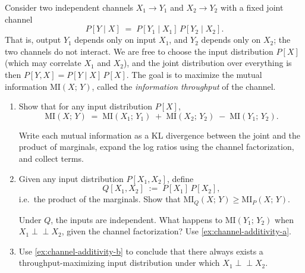 \documentclass[11pt]{article}
\begin{document}
\begin{exercise}
\label{ex:channel-additivity}
\noindent
Consider two independent channels $X_1 \to Y_1$ and $X_2 \to Y_2$ with a fixed
joint channel
\[
  P[Y \mid X] \;=\; P[Y_1 \mid X_1]\, P[Y_2 \mid X_2].
\]
That is, output $Y_1$ depends only on input $X_1$, and $Y_2$ depends only on $X_2$;
the two channels do not interact. We are free to choose the input distribution $P[X]$
(which may correlate $X_1$ and $X_2$), and the joint distribution over everything is
then $P[Y, X] = P[Y \mid X]\, P[X]$. The goal is to maximize the mutual information
$\mathrm{MI}(X;\, Y)$, called the \emph{information throughput} of the channel.

\begin{enumerate}
\item \label{ex:channel-additivity-a} Show that for any input distribution $P[X]$,
\[
  \mathrm{MI}(X;\, Y) \;=\;
  \mathrm{MI}(X_1;\, Y_1) \;+\; \mathrm{MI}(X_2;\, Y_2) \;-\;
  \mathrm{MI}(Y_1;\, Y_2).
\]

\begin{hint}

Write each mutual information as a KL divergence between the joint and
the product of marginals, expand the log ratios using the channel factorization, and
collect terms.
\end{hint}

\item \label{ex:channel-additivity-b} Given any input distribution $P[X_1, X_2]$, define
\[
  Q[X_1, X_2] \;:=\; P[X_1]\, P[X_2],
\]
i.e.\ the product of the marginals. Show that
$\mathrm{MI}_Q(X;\, Y) \geq \mathrm{MI}_P(X;\, Y)$.

\begin{hint}

Under $Q$, the inputs are independent. What happens to
$\mathrm{MI}(Y_1;\, Y_2)$ when $X_1 \perp\!\!\!\perp X_2$, given the channel
factorization? Use \cref{ex:channel-additivity-a}.
\end{hint}

\item \label{ex:channel-additivity-c} Use \cref{ex:channel-additivity-b} to conclude that there always exists a
throughput-maximizing input distribution under which $X_1 \perp\!\!\!\perp X_2$.

\end{enumerate}


\end{exercise}
\end{document}
